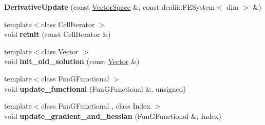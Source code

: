 \begin{DoxyCompactItemize}
\item 
\hypertarget{structSpacy_1_1dealII_1_1Detail_1_1DerivativeUpdate_3_01dim_00_01VariableDims_00_01row_00-1_01_4_aed18ce77df265d1a7437733ac4deb8f1}{{\bfseries Derivative\-Update} (const \hyperlink{classSpacy_1_1VectorSpace}{Vector\-Space} \&, const dealii\-::\-F\-E\-System$<$ dim $>$ \&)}\label{structSpacy_1_1dealII_1_1Detail_1_1DerivativeUpdate_3_01dim_00_01VariableDims_00_01row_00-1_01_4_aed18ce77df265d1a7437733ac4deb8f1}

\item 
\hypertarget{structSpacy_1_1dealII_1_1Detail_1_1DerivativeUpdate_3_01dim_00_01VariableDims_00_01row_00-1_01_4_a6102b9015e9caeb60892b3e2b6d46025}{{\footnotesize template$<$class Cell\-Iterator $>$ }\\void {\bfseries reinit} (const Cell\-Iterator \&)}\label{structSpacy_1_1dealII_1_1Detail_1_1DerivativeUpdate_3_01dim_00_01VariableDims_00_01row_00-1_01_4_a6102b9015e9caeb60892b3e2b6d46025}

\item 
\hypertarget{structSpacy_1_1dealII_1_1Detail_1_1DerivativeUpdate_3_01dim_00_01VariableDims_00_01row_00-1_01_4_a931687ca4f500ea302987e594d5f1fac}{{\footnotesize template$<$class Vector $>$ }\\void {\bfseries init\-\_\-old\-\_\-solution} (const \hyperlink{group__VectorSpaceGroup_ga65d64ee5f22f492639d0f950aa931071}{Vector} \&)}\label{structSpacy_1_1dealII_1_1Detail_1_1DerivativeUpdate_3_01dim_00_01VariableDims_00_01row_00-1_01_4_a931687ca4f500ea302987e594d5f1fac}

\item 
\hypertarget{structSpacy_1_1dealII_1_1Detail_1_1DerivativeUpdate_3_01dim_00_01VariableDims_00_01row_00-1_01_4_a77e300dd367b35bef882fbe8cfef0131}{{\footnotesize template$<$class Fun\-G\-Functional $>$ }\\void {\bfseries update\-\_\-functional} (Fun\-G\-Functional \&, unsigned)}\label{structSpacy_1_1dealII_1_1Detail_1_1DerivativeUpdate_3_01dim_00_01VariableDims_00_01row_00-1_01_4_a77e300dd367b35bef882fbe8cfef0131}

\item 
\hypertarget{structSpacy_1_1dealII_1_1Detail_1_1DerivativeUpdate_3_01dim_00_01VariableDims_00_01row_00-1_01_4_a5daf11e6e84c13688f0c8c412583a9d1}{{\footnotesize template$<$class Fun\-G\-Functional , class Index $>$ }\\void {\bfseries update\-\_\-gradient\-\_\-and\-\_\-hessian} (Fun\-G\-Functional \&, Index)}\label{structSpacy_1_1dealII_1_1Detail_1_1DerivativeUpdate_3_01dim_00_01VariableDims_00_01row_00-1_01_4_a5daf11e6e84c13688f0c8c412583a9d1}


\end{DoxyCompactItemize}
